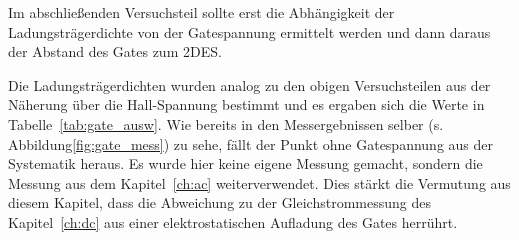 
Im abschließenden Versuchsteil sollte erst die Abhängigkeit der Ladungsträgerdichte von der Gatespannung ermittelt werden und dann daraus der Abstand des Gates zum 2DES.

Die Ladungsträgerdichten wurden analog zu den obigen Versuchsteilen aus der Näherung über die Hall-Spannung bestimmt und es ergaben sich die Werte in Tabelle~\ref{tab:gate_ausw}. Wie bereits in den Messergebnissen selber (s. Abbildung\ref{fig:gate_mess}) zu sehe, fällt der Punkt ohne Gatespannung aus der Systematik heraus. Es wurde hier keine eigene Messung gemacht, sondern die Messung aus dem Kapitel~\ref{ch:ac} weiterverwendet. Dies stärkt die Vermutung aus diesem Kapitel, dass die Abweichung zu der Gleichstrommessung des Kapitel~\ref{ch:dc} aus einer elektrostatischen Aufladung des Gates herrührt.


